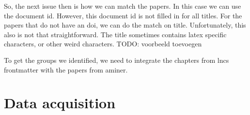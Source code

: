 \documentclass{ou-report}
\newcommand{\todo}[1]{{\color{red} TODO: #1}}
\begin{document}
So, the next issue then is how we can match the papers. In this case we can use
the document id. However, this document id is not filled in for all titles. For
the papers that do not have an doi, we can do the match on title. Unfortunately,
this also is not that straightforward. The title sometimes contains latex 
specific characters, or other weird characters.
\todo{voorbeeld toevoegen}

To get the groups we identified, we need to integrate the chapters from lncs 
frontmatter with the papers from aminer.

\chapter{Data acquisition}
\end{document}
